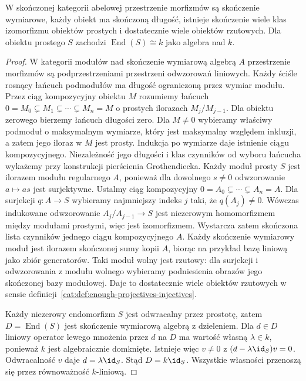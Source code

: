 \begin{stwierdzenie}\label{cat:prop:tf-finite-abelian-properties}
W skończonej kategorii abelowej przestrzenie morfizmów są skończenie wymiarowe, każdy obiekt ma skończoną długość, istnieje skończenie wiele klas izomorfizmu obiektów prostych i dostatecznie wiele obiektów rzutowych. Dla obiektu prostego $S$ zachodzi $\operatorname{End}(S)\cong k$ jako algebra nad $k$.
\end{stwierdzenie}
\begin{proof}
W kategorii modułów nad skończenie wymiarową algebrą $A$ przestrzenie morfizmów są podprzestrzeniami przestrzeni odwzorowań liniowych. Każdy ściśle rosnący łańcuch podmodułów ma długość ograniczoną przez wymiar modułu. Przez ciąg kompozycyjny obiektu $M$ rozumiemy łańcuch $0=M_0\subsetneq M_1\subsetneq\cdots\subsetneq M_n=M$ o prostych ilorazach $M_j/M_{j-1}$. Dla obiektu zerowego bierzemy łańcuch długości zero. Dla $M\neq0$ wybieramy właściwy podmoduł o maksymalnym wymiarze, który jest maksymalny względem inkluzji, a zatem jego iloraz w $M$ jest prosty. Indukcja po wymiarze daje istnienie ciągu kompozycyjnego. Niezależność jego długości i klas czynników od wyboru łańcucha wykażemy przy konstrukcji pierścienia Grothendiecka. Każdy moduł prosty $S$ jest ilorazem modułu regularnego $A$, ponieważ dla dowolnego $s\neq0$ odwzorowanie $a\mapsto as$ jest surjektywne. Ustalmy ciąg kompozycyjny $0=A_0\subsetneq\cdots\subsetneq A_n=A$. Dla surjekcji $q:A\to S$ wybieramy najmniejszy indeks $j$ taki, że $q(A_j)\neq0$. Wówczas indukowane odwzorowanie $A_j/A_{j-1}\to S$ jest niezerowym homomorfizmem między modułami prostymi, więc jest izomorfizmem. Wystarcza zatem skończona lista czynników jednego ciągu kompozycyjnego $A$. Każdy skończenie wymiarowy moduł jest ilorazem skończonej sumy kopii $A$, biorąc na przykład bazę liniową jako zbiór generatorów. Taki moduł wolny jest rzutowy: dla surjekcji i odwzorowania z modułu wolnego wybieramy podniesienia obrazów jego skończonej bazy modułowej. Daje to dostatecznie wiele obiektów rzutowych w sensie definicji~\ref{cat:def:enough-projectives-injectives}.

Każdy niezerowy endomorfizm $S$ jest odwracalny przez prostotę, zatem $D=\operatorname{End}(S)$ jest skończenie wymiarową algebrą z dzieleniem. Dla $d\in D$ liniowy operator lewego mnożenia przez $d$ na $D$ ma wartość własną $\lambda\in k$, ponieważ $k$ jest algebraicznie domknięte. Istnieje więc $v\neq0$ z $(d-\lambda\id_S)v=0$. Odwracalność $v$ daje $d=\lambda\id_S$. Stąd $D=k\id_S$. Wszystkie własności przenoszą się przez równoważność $k$-liniową.
\end{proof}

